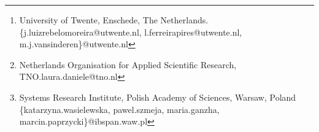 \documentclass{sig-alternate-05-2015}
\begin{document}
\author{
%
%
\alignauthor
João Moreira\thanks{University of Twente, Enschede, The Netherlands.\newline\{j.luizrebelomoreira@utwente.nl, l.ferreirapires@utwente.nl, m.j.vansinderen\}@utwente.nl} 
\alignauthor
Laura Daniele\thanks{Netherlands Organisation for Applied Scientific Research, TNO.\newline laura.daniele@tno.nl}\\
\alignauthor 
Luis Ferreira Pires\footnotemark[1]\\
\and  %
\alignauthor 
Marten van Sinderen\footnotemark[1]\\
\alignauthor 
Katarzyna Wasielewska\thanks{Systems Research Institute, Polish Academy of Sciences, Warsaw, Poland \newline\{katarzyna.wasielewska, pawel.szmeja, maria.ganzha, marcin.paprzycki\}@ibspan.waw.pl}\\
}
\end{document}
